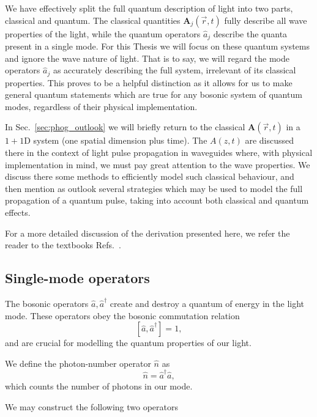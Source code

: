 We have effectively split the full quantum description of light into two parts, classical and quantum. The classical quantities $\bm{A}_j\left(\overrightarrow{r}, t\right)$ fully describe all wave properties of the light, while the quantum operators $\hat{a}_j$ describe the quanta present in a single mode. For this Thesis we will focus on these quantum systems and ignore the wave nature of light. That is to say, we will regard the mode operators $\hat{a}_j$ as accurately describing the full system, irrelevant of its classical properties. This proves to be a helpful distinction as it allows for us to make general quantum statements which are true for any bosonic system of quantum modes, regardless of their physical implementation.

In Sec.~\ref{sec:phog_outlook} we will briefly return to the classical $\bm{A}\left(\overrightarrow{r}, t\right)$ in a $1+1$D system (one spatial dimension plus time). The $A\left(z, t\right)$ are discussed there in the context of light pulse propagation in waveguides where, with physical implementation in mind, we must pay great attention to the wave properties. We discuss there some methods to efficiently model such classical behaviour, and then mention as outlook several strategies which may be used to model the full propagation of a quantum pulse, taking into account both classical and quantum effects.

For a more detailed discussion of the derivation presented here, we refer the reader to the textbooks Refs.~\cite{Leonhardt2010, Walls_Millburn_Textbook, Gerry_Knight_Textbook}.


\FloatBarrier
\subsection{Single-mode operators}
The bosonic operators $\hat{a}, \hat{a}^\dagger$ create and destroy a quantum of energy in the light mode. These operators obey the bosonic commutation relation
\begin{equation}
\left[ \hat{a}, \hat{a}^\dagger \right] = 1,
\end{equation}
and are crucial for modelling the quantum properties of our light. 

We define the photon-number operator $\hat{n}$ as 
\begin{equation}
\hat{n} = \hat{a}^\dagger \hat{a},
\end{equation}
which counts the number of photons in our mode.

We may construct the following two operators

